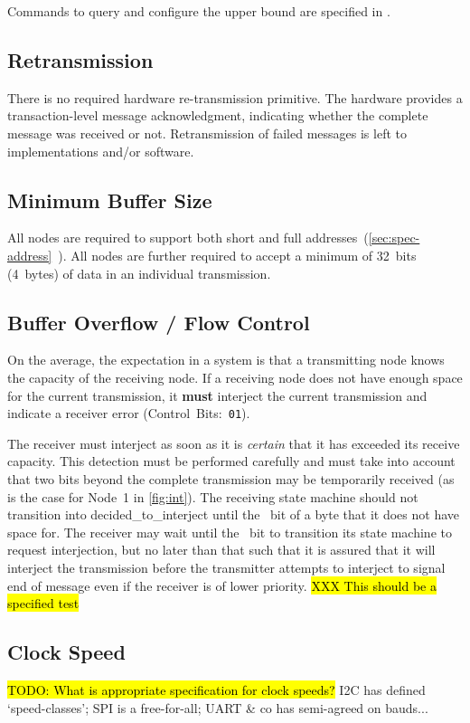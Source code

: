 Commands to query and configure the upper bound are specified in
.

\subsection{Retransmission}
There is no required hardware re-transmission primitive. The hardware provides
a transaction-level message acknowledgment, indicating whether the complete
message was received or not. Retransmission of failed messages is left to
implementations and/or software.

\subsection{Minimum Buffer Size}
All \bus nodes are required to support both short and full
addresses~(\ref{sec:spec-address}~). All \bus nodes
are further required to accept a minimum of 32~bits (4~bytes) of data in an
individual transmission.

\subsection{Buffer Overflow / Flow Control}
On the average, the expectation in a \bus system is that a transmitting node
knows the capacity of the receiving node. If a receiving node does not have
enough space for the current transmission, it {\bf must} interject the current
transmission and indicate a receiver error (Control~Bits:~{\tt 01}).

The receiver must interject as soon as it is {\em certain} that it has
exceeded its receive capacity. This detection must be performed carefully and
must take into account that two bits beyond the complete transmission may be
temporarily received (as is the case for Node~1 in \cref{fig:int}). The
receiving state machine should not transition into {\sc
decided\_to\_interject} until the ~bit of a byte that it does not have
space for. The receiver may wait until the ~bit to transition its state
machine to request interjection, but no later than that such that it is
assured that it will interject the transmission before the transmitter
attempts to interject to signal end of message even if the receiver is of
lower priority.
\hl{XXX This should be a specified test}

\subsection{Clock Speed}
\hl{TODO: What is appropriate specification for clock speeds?} I2C has defined
`speed-classes'; SPI is a free-for-all; UART \& co has semi-agreed on bauds...


